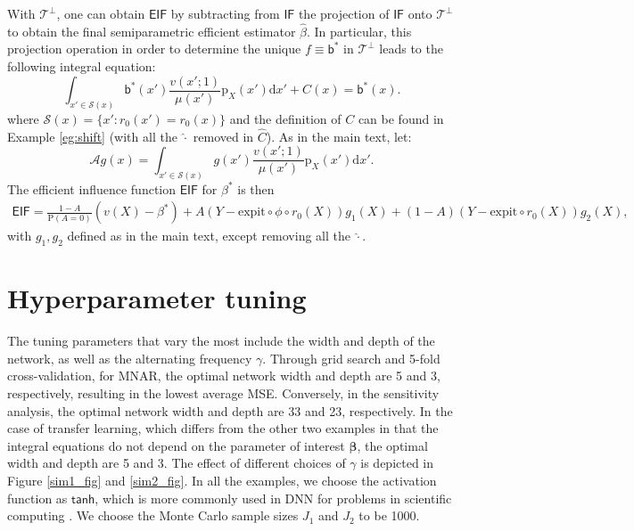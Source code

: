 \documentclass{article}
\def\IIF{\mathsf{IF}}
\def\EIF{\mathsf{EIF}}
\def\tanh{\mathsf{tanh}}
\def\sfb{\mathsf{b}}
\def\sfb{\mathsf{b}}
\def\expit{\mathrm{expit}}
\theoremstyle{plain}
\theoremstyle{definition}
\theoremstyle{remark}
\def\diff{\mathrm{d}}
\def\P{\mathrm{P}}
\def\bbeta{\boldsymbol{\beta}}
\def\hat{\widehat}
\def\p{\mathrm{p}}
\begin{document}
With $\mathcal{T}^{\perp}$, one can obtain $\EIF$ by subtracting from $\IIF$ the projection of $\IIF$ onto $\mathcal{T}^{\perp}$ to obtain the final semiparametric efficient estimator $\hat{\beta}$. In particular, this projection operation in order to determine the unique $f \equiv \sfb^\ast$ in $\mathcal{T}^{\perp}$ leads to the following integral equation:
\begin{equation*}
\int _{x' \in \mathcal{S}(x)}\sfb^{\ast}(x') \frac{v(x' ; 1)}{\mu(x')} \p_{X}(x') \diff x' + C(x) = \sfb^{\ast}(x).
\end{equation*}
where $\mathcal{S}(x) = \{x' :r_{0} (x')=r_{0}(x)\}$ and the definition of $C$ can be found in Example \ref{eg:shift} (with all the $\hat{\cdot}$ removed in $\hat{C}$).
As in the main text, let:
$$
\mathscr{A} g(x)=\int _{x' \in \mathcal{S}(x)}g(x') \frac{v(x' ; 1)}{\mu(x')} \p_{X} (x') \diff x'.
$$
The efficient influence function $\EIF$ for $\beta^*$ is then
\begin{align*}
\EIF = \frac{1 - A}{\P (A = 0)} (v (X) - \beta^\ast) + A (Y - \expit \circ \phi \circ r_0 (X)) g_1 (X) + (1 - A) (Y - \expit \circ r_0 (X)) g_2 (X),
\end{align*}
with $g_1, g_2$ defined as in the main text, except removing all the $\hat{\cdot}$.

\section{Hyperparameter tuning}
\label{app:hyper}

The tuning parameters that vary the most include the width and depth of the network, as well as the alternating frequency $\gamma$. Through grid search and 5-fold cross-validation, for MNAR, the optimal network width and depth are 5 and 3, respectively, resulting in the lowest average MSE. Conversely, in the sensitivity analysis, the optimal network width and depth are 33 and 23, respectively. In the case of transfer learning, which differs from the other two examples in that the integral equations do not depend on the parameter of interest $\bbeta$, the optimal width and depth are 5 and 3. The effect of different choices of $\gamma$ is depicted in Figure \ref{sim1_fig} and \ref{sim2_fig}. In all the examples, we choose the activation function as $\tanh$, which is more commonly used in DNN for problems in scientific computing \citep{lu2022machine}. We choose the Monte Carlo sample sizes $J_1$ and $J_2$ to be 1000.
\end{document}
